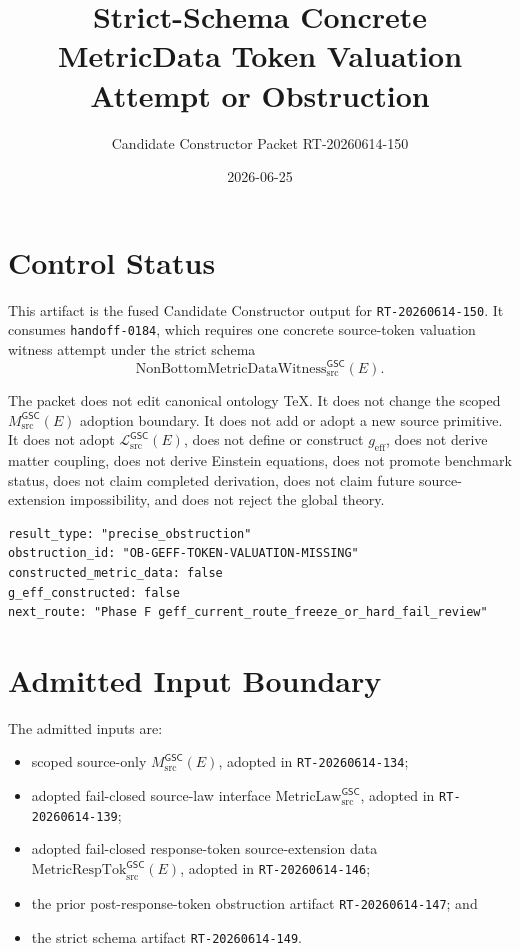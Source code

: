 \documentclass[11pt]{article}
\title{Strict-Schema Concrete MetricData Token Valuation Attempt or Obstruction}
\author{Candidate Constructor Packet RT-20260614-150}
\date{2026-06-25}
\newcommand{\MsrcGSC}{M_{\mathrm{src}}^{\mathsf{GSC}}}
\newcommand{\MetricLaw}{\mathrm{MetricLaw}_{\mathrm{src}}^{\mathsf{GSC}}}
\newcommand{\MetricRespTok}{\mathrm{MetricRespTok}_{\mathrm{src}}^{\mathsf{GSC}}}
\newcommand{\Witness}{\mathrm{NonBottomMetricDataWitness}_{\mathrm{src}}^{\mathsf{GSC}}}
\newcommand{\MetricData}{\mathcal{L}_{\mathrm{src}}^{\mathsf{GSC}}}
\newcommand{\geff}{g_{\mathrm{eff}}}
\begin{document}
\maketitle

\section{Control Status}

This artifact is the fused Candidate Constructor output for
\texttt{RT-20260614-150}. It consumes \texttt{handoff-0184}, which requires
one concrete source-token valuation witness attempt under the strict schema
\[
  \Witness(E).
\]

The packet does not edit canonical ontology TeX. It does not change the
scoped \(\MsrcGSC(E)\) adoption boundary. It does not add or adopt a new
source primitive. It does not adopt \(\MetricData(E)\), does not define or
construct \(\geff\), does not derive matter coupling, does not derive
Einstein equations, does not promote benchmark status, does not claim
completed derivation, does not claim future source-extension impossibility,
and does not reject the global theory.

\begin{verbatim}
result_type: "precise_obstruction"
obstruction_id: "OB-GEFF-TOKEN-VALUATION-MISSING"
constructed_metric_data: false
g_eff_constructed: false
next_route: "Phase F geff_current_route_freeze_or_hard_fail_review"
\end{verbatim}

\section{Admitted Input Boundary}

The admitted inputs are:
\begin{itemize}[leftmargin=*]
  \item scoped source-only \(\MsrcGSC(E)\), adopted in
  \texttt{RT-20260614-134};
  \item adopted fail-closed source-law interface \(\MetricLaw\), adopted in
  \texttt{RT-20260614-139};
  \item adopted fail-closed response-token source-extension data
  \(\MetricRespTok(E)\), adopted in \texttt{RT-20260614-146};
  \item the prior post-response-token obstruction artifact
  \texttt{RT-20260614-147}; and
  \item the strict schema artifact \texttt{RT-20260614-149}.
\end{itemize}
\end{document}
